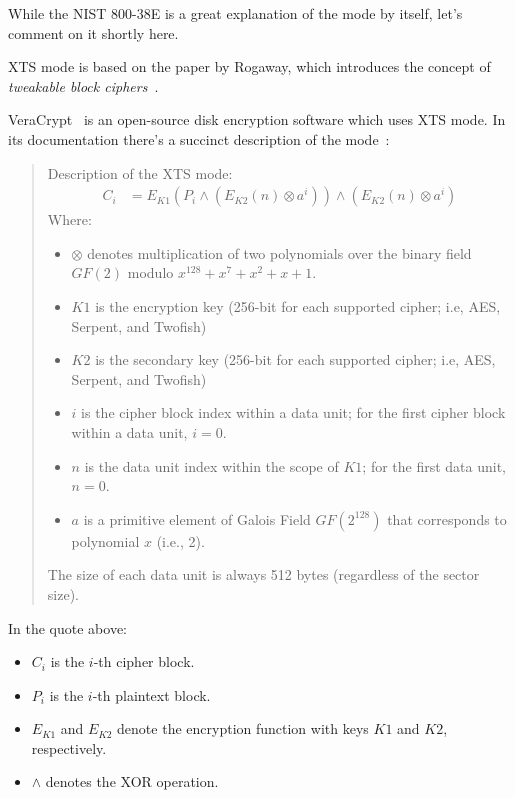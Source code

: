 While the NIST 800-38E is a great explanation of the mode by itself, let's comment on it shortly here.

XTS mode is based on the paper by Rogaway, which introduces the concept of \textit{tweakable block ciphers}~\cite{Rogaway}.

VeraCrypt~\cite{VeraCrypt} is an open-source disk encryption software which uses XTS mode.
In its documentation there's a succinct description of the mode~\cite{VeraCrypt-modes}:

\begin{quote}
    Description of the XTS mode:
    \begin{align*}
        C_i &= E_{K1}(P_i \wedge (E_{K2}(n) \otimes a^i)) \wedge (E_{K2}(n) \otimes a^i)
    \end{align*}
    Where:
    \begin{itemize}
        \item $\otimes$ denotes multiplication of two polynomials over the binary field $GF(2)$ modulo $x^{128} + x^7 + x^2 + x + 1$.
        \item $K1$ is the encryption key (256-bit for each supported cipher; i.e, AES, Serpent, and Twofish)
        \item $K2$ is the secondary key (256-bit for each supported cipher; i.e, AES, Serpent, and Twofish)
        \item $i$ is the cipher block index within a data unit; for the first cipher block within a data unit, $i = 0$.
        \item $n$ is the data unit index within the scope of $K1$; for the first data unit, $n = 0$.
        \item $a$ is a primitive element of Galois Field $GF(2^{128})$ that corresponds to polynomial $x$ (i.e., 2).
    \end{itemize}
    The size of each data unit is always 512 bytes (regardless of the sector size).
\end{quote}

In the quote above:
\begin{itemize}
    \item $C_i$ is the $i$-th cipher block.
    \item $P_i$ is the $i$-th plaintext block.
    \item $E_{K1}$ and $E_{K2}$ denote the encryption function with keys $K1$ and $K2$, respectively.
    \item $\wedge$ denotes the XOR operation.
\end{itemize}

